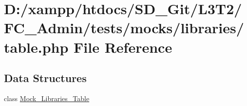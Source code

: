 \hypertarget{_admin_2tests_2mocks_2libraries_2_table_8php}{}\section{D\+:/xampp/htdocs/\+S\+D\+\_\+\+Git/\+L3\+T2/\+F\+C\+\_\+\+Admin/tests/mocks/libraries/table.php File Reference}
\label{_admin_2tests_2mocks_2libraries_2_table_8php}
\subsection*{Data Structures}
\begin{DoxyCompactItemize}
\item 
class \hyperlink{class_mock___libraries___table}{Mock\+\_\+\+Libraries\+\_\+\+Table}
\end{DoxyCompactItemize}
